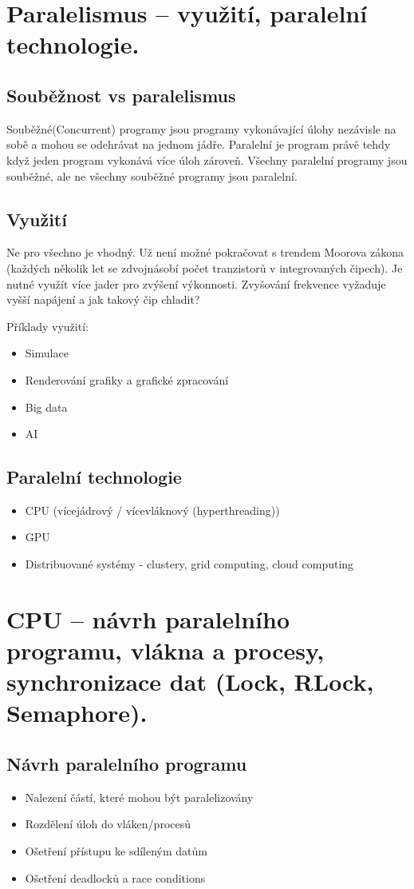 \section{Paralelismus – využití, paralelní technologie.}
\subsection{Souběžnost vs paralelismus}
Souběžné(Concurrent) programy jsou programy vykonávající úlohy nezávisle na sobě a mohou se odehrávat na jednom jádře.
Paralelní je program právě tehdy když jeden program vykonává více úloh zároveň. Všechny paralelní programy jsou 
souběžné, ale ne všechny souběžné programy jsou paralelní.

\subsection{Využití}
Ne pro všechno je vhodný. Už není možné pokračovat s trendem Moorova zákona (každých několik let se zdvojnásobí počet tranzistorů
v integrovaných čipech). Je nutné využít více jader pro zvýšení výkonnosti. Zvyšování frekvence vyžaduje vyšší napájení a jak 
takový čip chladit?

Příklady využití: 
\begin{itemize}
    \item Simulace
    \item Renderování grafiky a grafické zpracování
    \item Big data
    \item AI
\end{itemize}

\subsection{Paralelní technologie}
\begin{itemize}
    \item CPU (vícejádrový / vícevláknový (hyperthreading))
    \item GPU
    \item Distribuované systémy - clustery, grid computing, cloud computing
\end{itemize}

\section{CPU – návrh paralelního programu, vlákna a procesy, synchronizace dat (Lock, RLock, Semaphore).}
\subsection{Návrh paralelního programu}
\begin{itemize}
    \item Nalezení částí, které mohou být paralelizovány
    \item Rozdělení úloh do vláken/procesů
    \item Ošetření přístupu ke sdíleným datům
    \item Ošetření deadlocků a race conditions
\end{itemize}

